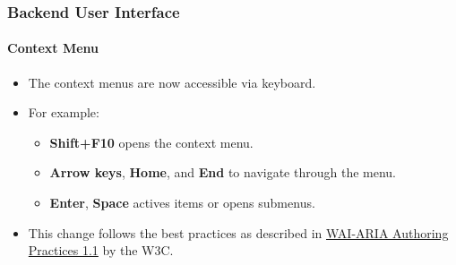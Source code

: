 %

\begin{frame}[fragile]
	\frametitle{Backend User Interface}
	\framesubtitle{Context Menu}

	\begin{itemize}
		\item The context menus are now accessible via keyboard.
		\item For example:

			\begin{itemize}\small
				\item \textbf{Shift+F10} opens the context menu.
				\item \textbf{Arrow keys}, \textbf{Home}, and \textbf{End} to navigate through the menu.
				\item \textbf{Enter}, \textbf{Space} actives items or opens submenus.
			\end{itemize}

		\item This change follows the best practices as described in
			\href{https://www.w3.org/TR/wai-aria-practices-1.1/#keyboard-interaction-12}{WAI-ARIA Authoring Practices 1.1}
			by the W3C.

	\end{itemize}

\end{frame}

